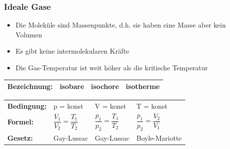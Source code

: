 	\subsubsection{Ideale Gase}
		\begin{minipage}{15cm}
				\begin{itemize}
					\item Die Moleküle sind Massenpunkte, d.h. sie haben eine Masse aber kein Volumen
					\item Es gibt keine intermolekularen Kräfte
					\item Die Gas-Temperatur ist weit höher als die kritische Temperatur
				\end{itemize}
				\renewcommand{\arraystretch}{1.5}
				\begin{tabular}{ | p{3cm} | p{4cm} | p{4cm} | p{4cm} |}
					\hline
					\textbf{Bezeichnung:} & \textbf{isobare} & \textbf{isochore} & \textbf{isotherme}\\
					\hline
				\end{tabular}
				\renewcommand{\arraystretch}{2}
				\begin{tabular}{ | p{3cm} | p{4cm} | p{4cm} | p{4cm} |}
					\textbf{Bedingung:} & p = konst & V = konst & T = konst\\
					\textbf{Formel:} & $\dfrac{V_1}{V_2} = \dfrac{T_1}{T_2}$ & $\dfrac{p_1}{p_2} = \dfrac{T_1}{T_2}$ & $\dfrac{p_1}{p_2} = \dfrac{V_2}{V_1}$\\
					\textbf{Gesetz:} & Gay-Lussac & Gay-Lussac & Boyle-Mariotte\\
					\hline
				\end{tabular}
				\renewcommand{\arraystretch}{1}
		\end{minipage}
		\newline
		\newline
		\newline

